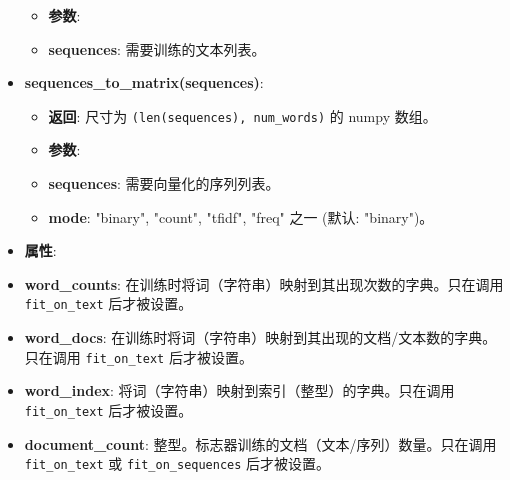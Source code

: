 \begin{itemize}
  \begin{itemize}
  \tightlist
  \item
    \textbf{参数}:
  \item
    \textbf{sequences}: 需要训练的文本列表。
  \end{itemize}
\item
  \textbf{sequences\_to\_matrix(sequences)}:

  \begin{itemize}
  \tightlist
  \item
    \textbf{返回}: 尺寸为 \texttt{(len(sequences),\ num\_words)} 的
    numpy 数组。
  \item
    \textbf{参数}:
  \item
    \textbf{sequences}: 需要向量化的序列列表。
  \item
    \textbf{mode}: "binary", "count", "tfidf", "freq" 之一 (默认:
    "binary")。
  \end{itemize}
\item
  \textbf{属性}:
\item
  \textbf{word\_counts}:
  在训练时将词（字符串）映射到其出现次数的字典。只在调用
  \texttt{fit\_on\_text} 后才被设置。
\item
  \textbf{word\_docs}:
  在训练时将词（字符串）映射到其出现的文档/文本数的字典。只在调用
  \texttt{fit\_on\_text} 后才被设置。
\item
  \textbf{word\_index}: 将词（字符串）映射到索引（整型）的字典。只在调用
  \texttt{fit\_on\_text} 后才被设置。
\item
  \textbf{document\_count}:
  整型。标志器训练的文档（文本/序列）数量。只在调用
  \texttt{fit\_on\_text} 或 \texttt{fit\_on\_sequences} 后才被设置。
\end{itemize}
\newpage
